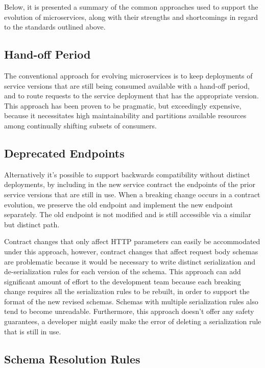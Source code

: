 Below, it is presented a summary of the common approaches used to support the evolution of microservices,
along with their strengths and shortcomings in regard to the standards outlined above.

\subsection{Hand-off Period} %
\label{sec:hand_off_period}

The conventional approach for evolving microservices is to keep deployments of service versions that are still being consumed available with a hand-off period,
and to route requests to the service deployment that has the appropriate version.
This approach has been proven to be pragmatic, but exceedingly expensive,
because it necessitates high maintainability and partitions available resources among continually shifting subsets of consumers.

\subsection{Deprecated Endpoints} %
\label{sec:deprecated_endpoints}

Alternatively it's possible to support backwards compatibility without distinct deployments,
by including in the new service contract the endpoints of the prior service versions that are still in use.
When a breaking change occurs in a contract evolution, we preserve the old endpoint and implement the new endpoint separately.
The old endpoint is not modified and is still accessible via a similar but distinct path.

Contract changes that only affect HTTP parameters can easily be accommodated under this approach, however, contract changes that affect
request body schemas are problematic because it would be necessary to write distinct serialization and de-serialization rules for each version of the schema.
This approach can add significant amount of effort to the development team because each breaking change requires all the serialization rules to be rebuilt,
in order to support the format of the new revised schemas.
Schemas with multiple serialization rules also tend to become unreadable.
Furthermore, this approach doesn't offer any safety guarantees,
a developer might easily make the error of deleting a serialization rule that is still in use.

\subsection{Schema Resolution Rules} %
\label{sec:schema_resolution_rules}

